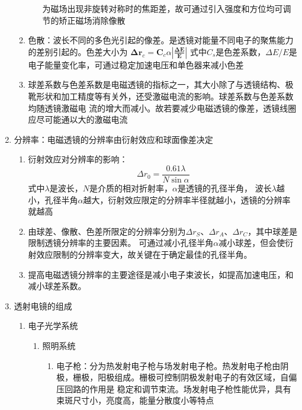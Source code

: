 \documentclass[12pt,a4paper]{article}
\begin{document}
\begin{enumerate}
\begin{enumerate}
\begin{enumerate}
                    为磁场出现非旋转对称时的焦距差，故可通过引入强度和方位均可调节的矫正磁场消除像散
            \end{enumerate}
            \item 色散：波长不同的多色光引起的像差。是透镜对能量不同电子的聚焦能力的差别引起的。色差大小为
                $\boldsymbol{\Delta} \boldsymbol{r}_{c}=\boldsymbol{C}_{c} \alpha\left|\frac{\boldsymbol{\Delta} \boldsymbol{E}}{\boldsymbol{E}}\right|$
                式中$C_{s}$是色差系数，$\Delta E / E$是电子能量变化率，可通过稳定加速电压和单色器来减小色差
            \item 球差系数与色差系数是电磁透镜的指标之一，其大小除了与透镜结构、极靴形状和加工精度等有关外，还受激磁电流的影响。球差系数与色差系数均随透镜激磁电
                流的增大而减小。故若要减少电磁透镜的像差，透镜线圈应尽可能通以大的激磁电流
        \end{enumerate}
        \item 分辨率：电磁透镜的分辨率由衍射效应和球面像差决定
        \begin{enumerate}
            \item 衍射效应对分辨率的影响：$$\Delta r_{0}=\frac{0.61 \lambda}{N \sin \alpha}$$
                式中$\lambda$是波长，$N$是介质的相对折射率，$\alpha$是透镜的孔径半角，
                波长$\lambda$越小，孔径半角$\alpha$越大，衍射效应限定的分辨率半径就越小，透镜的分辨率就越高
            \item 由球差、像散、色差所限定的分辨率分别为$\Delta r_{S}$、$\Delta r_{A}$、$\Delta r_{C}$，其中球差是限制透镜分辨率的主要因素。
                可通过减小孔径半角$\alpha$减小球差，但会使衍射效应限制的分辨率变大，故关键在于确定最佳的孔径半角。
            \item 提高电磁透镜分辨率的主要途径是减小电子束波长，如提高加速电压，和减小球差系数。
        \end{enumerate}
        \item 透射电镜的组成
        \begin{enumerate}
            \item 电子光学系统
            \begin{enumerate}
                \item 照明系统
                \begin{enumerate}
                    \item 电子枪：分为热发射电子枪与场发射电子枪。热发射电子枪由阴极，栅极，阳极组成。栅极可控制阴极发射电子的有效区域，自偏压回路的作用是
                        稳定和调节束流。场发射电子枪性能优异，具有束斑尺寸小，亮度高，能量分散度小等特点

\end{enumerate}
\end{enumerate}
\end{enumerate}
\end{enumerate}
\end{document}
